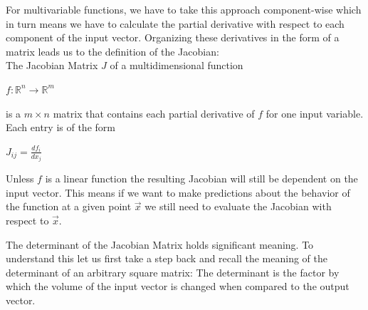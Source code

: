 \documentclass[journal]{IEEEtran}
\begin{document}
For multivariable functions, we have to take this approach component-wise which in turn means we have to calculate the partial derivative with respect to each component of the input vector. Organizing these derivatives in the form of a matrix leads us to the definition of the Jacobian:\\
The Jacobian Matrix $J$ of a multidimensional function
\begin{center} $f: \mathbb{R}^n \rightarrow \mathbb{R}^m$ \end{center}
is a $m \times n$ matrix that contains each partial derivative of $f$ for one input variable\cite[107]{GdR}.
Each entry is of the form
\begin{center} $J_{ij} = \frac{df_i}{dx_j}$ \end{center}
Unless $f$ is a linear function the resulting Jacobian will still be dependent on the input vector. This means if we want to make predictions about the behavior of the function at a given point $\vec{x}$ we still need to evaluate the Jacobian with respect to $\vec{x}$.

The determinant of the Jacobian Matrix holds significant meaning. To understand this let us first take a step back and recall the meaning of the determinant of an arbitrary square matrix: The determinant is the factor by which the volume of the input vector is changed when compared to the output vector.
\end{document}

